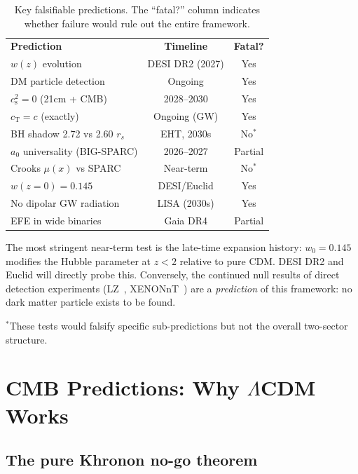 \documentclass[prd,twocolumn,superscriptaddress,longbibliography,floatfix]{revtex4-2}
\newcommand{\cs}{c_{\mathrm{s}}}
\newcommand{\cT}{c_{\mathrm{T}}}
\begin{document}
\begin{table}[t]
\caption{\label{tab:falsify}Key falsifiable predictions.
The ``fatal?'' column indicates whether failure would
rule out the entire framework.}
\begin{ruledtabular}
\begin{tabular}{lcc}
\textbf{Prediction} & \textbf{Timeline} & \textbf{Fatal?} \\
\colrule
$w(z)$ evolution & DESI DR2 (2027) & Yes \\
DM particle detection & Ongoing & Yes \\
$\cs^2 = 0$ (21cm + CMB) & 2028--2030 & Yes \\
$\cT = c$ (exactly) & Ongoing (GW) & Yes \\
BH shadow 2.72 vs 2.60 $r_s$ & EHT, 2030s & No$^*$ \\
$a_0$ universality (BIG-SPARC) & 2026--2027 & Partial \\
Crooks $\mu(x)$ vs SPARC & Near-term & No$^*$ \\
$w(z{=}0) = 0.145$ & DESI/Euclid & Yes \\
No dipolar GW radiation & LISA (2030s) & Yes \\
EFE in wide binaries & Gaia DR4 & Partial \\
\end{tabular}
\end{ruledtabular}
\end{table}

The most stringent near-term test is the late-time
expansion history: $w_0 = 0.145$ modifies the
Hubble parameter at $z < 2$ relative to pure CDM.
DESI DR2 and Euclid will directly probe this.  Conversely,
the continued null results of direct detection experiments
(LZ~\cite{LZ2024}, XENONnT~\cite{XENON2023}) are a \emph{prediction} of this
framework: no dark matter particle exists to be found.

$^*$These tests would falsify specific sub-predictions but
not the overall two-sector structure.


\section{CMB Predictions: Why \texorpdfstring{$\Lambda$CDM}{LCDM} Works}
\label{sec:cmb}

\subsection{The pure Khronon no-go theorem}
\label{sec:nogo}
\end{document}
